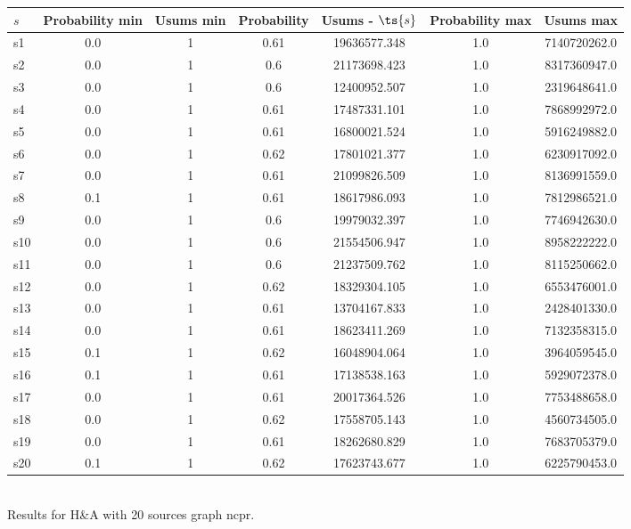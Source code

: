 \documentclass{article}
\begin{document}
\noindent\begin{tabular}{|l|c|c|c|c|c|c|}
\hline
$s$& Probability min & Usums min & Probability & Usums - $\ts{s}$ & Probability max & Usums max\\
\hline
s1 &0.0 & 1 & 0.61 & 19636577.348 & 1.0 & 7140720262.0\\
\hline
s2 &0.0 & 1 & 0.6 & 21173698.423 & 1.0 & 8317360947.0\\
\hline
s3 &0.0 & 1 & 0.6 & 12400952.507 & 1.0 & 2319648641.0\\
\hline
s4 &0.0 & 1 & 0.61 & 17487331.101 & 1.0 & 7868992972.0\\
\hline
s5 &0.0 & 1 & 0.61 & 16800021.524 & 1.0 & 5916249882.0\\
\hline
s6 &0.0 & 1 & 0.62 & 17801021.377 & 1.0 & 6230917092.0\\
\hline
s7 &0.0 & 1 & 0.61 & 21099826.509 & 1.0 & 8136991559.0\\
\hline
s8 &0.1 & 1 & 0.61 & 18617986.093 & 1.0 & 7812986521.0\\
\hline
s9 &0.0 & 1 & 0.6 & 19979032.397 & 1.0 & 7746942630.0\\
\hline
s10 &0.0 & 1 & 0.6 & 21554506.947 & 1.0 & 8958222222.0\\
\hline
s11 &0.0 & 1 & 0.6 & 21237509.762 & 1.0 & 8115250662.0\\
\hline
s12 &0.0 & 1 & 0.62 & 18329304.105 & 1.0 & 6553476001.0\\
\hline
s13 &0.0 & 1 & 0.61 & 13704167.833 & 1.0 & 2428401330.0\\
\hline
s14 &0.0 & 1 & 0.61 & 18623411.269 & 1.0 & 7132358315.0\\
\hline
s15 &0.1 & 1 & 0.62 & 16048904.064 & 1.0 & 3964059545.0\\
\hline
s16 &0.1 & 1 & 0.61 & 17138538.163 & 1.0 & 5929072378.0\\
\hline
s17 &0.0 & 1 & 0.61 & 20017364.526 & 1.0 & 7753488658.0\\
\hline
s18 &0.0 & 1 & 0.62 & 17558705.143 & 1.0 & 4560734505.0\\
\hline
s19 &0.0 & 1 & 0.61 & 18262680.829 & 1.0 & 7683705379.0\\
\hline
s20 &0.1 & 1 & 0.62 & 17623743.677 & 1.0 & 6225790453.0\\
\hline
\end{tabular}\\

\noindent Results for H\&A with 20 sources graph ncpr.
\end{document}
